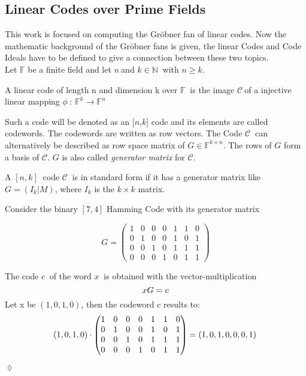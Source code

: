    

\newpage

\subsection{Linear Codes over Prime Fields}
\label{subsec:linearcodes}
This work is focused on computing the Gröbner fan of linear codes. Now the mathematic background of the Gröbner fans is given, the linear Codes and Code Ideals have to be defined to give a connection between these two topics.\\ 
Let $\mathbb{F}$ be a finite field and let $n~$and $k\in \mathbb{N}~$ with $n\geq k$.
\begin{env_definition}
\cite{dueckjournal} A linear code of length n and dimension k over $\mathbb{F}~$ is the image $\mathcal{C}~$of a injective linear mapping $\phi~:~\mathbb{F}^{k} \rightarrow \mathbb{F}^{n}$
\end{env_definition} 
Such a code will be denoted as an [$n$,$k$] code and its elements are called codewords. The codewords are written 
as row vectors. The Code $\mathcal{C}~$ can alternatively be described as row space matrix of $G \in \mathbb{F}^{k \times n}$. The rows of $G$ form a basis of $\mathcal{C}$.
$G$ is also called \textit{generator matrix} for $\mathcal{C}$.
\begin{env_definition}
\cite{dueckjournal}
A $[n,k]~$ code $\mathcal{C}~$ is in standard form if it has a generator matrix like $G = (I_{k}| M)$, where $I_{k}$ is the $k \times k$ matrix.
\end{env_definition}


\begin{env_example}\normalfont
Consider the binary $[7,4]$ Hamming Code with its generator matrix

\[
G =
\begin{pmatrix}
1 & 0 & 0 & 0 & 1 & 1 & 0 \\ 
0 & 1 & 0 & 0 & 1 & 0 & 1 \\  
0 & 0 & 1 & 0 & 1 & 1 & 1 \\ 
0 & 0 & 0 & 1 & 0 & 1 & 1
\end{pmatrix} 
\]

The code $c~$ of the word $x~$ is obtained with the vector-multiplication
\[
     xG = c \\
 \]
 Let x be $\left(1,0,1,0\right)$, then the codeword c results to:
 \[
      \left(1,0,1,0\right) \cdot \begin{pmatrix}
      1 & 0 & 0 & 0 & 1 & 1 & 0 \\ 
      0 & 1 & 0 & 0 & 1 & 0 & 1 \\  
      0 & 0 & 1 & 0 & 1 & 1 & 1 \\ 
      0 & 0 & 0 & 1 & 0 & 1 & 1
      \end{pmatrix}   = \left(1,0,1,0,0,0,1\right) \\
  \]
\begin{flushright}
$\lozenge$
\end{flushright} 

\end{env_example}

